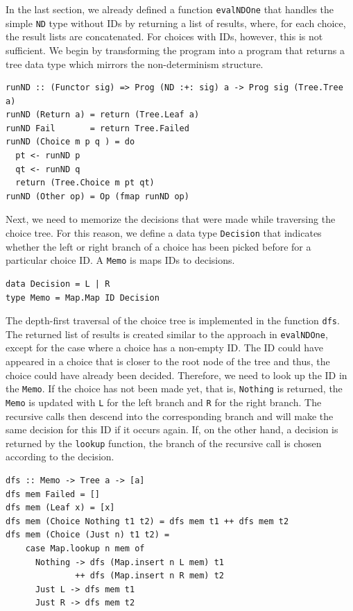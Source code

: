 \documentclass[a4paper, 11pt, fleqn, twoside]{scrreprt}
\newcommand{\todo}[1]{\marginpar{\textbf{TODO:} #1}}
\newcommand{\hinl}[1]{\texttt{#1}}
\begin{document}
In the last section, we already defined a function \hinl{evalNDOne} that handles the simple \hinl{ND} type without IDs by returning a list of results, where, for each choice, the result lists are concatenated.
For choices with IDs, however, this is not sufficient.
We begin by transforming the program into a program that returns a tree data type which mirrors the non-determinism structure.
\todo{Keep tree structure?}
 
\begin{verbatim}
runND :: (Functor sig) => Prog (ND :+: sig) a -> Prog sig (Tree.Tree a)
runND (Return a) = return (Tree.Leaf a)
runND Fail       = return Tree.Failed
runND (Choice m p q ) = do
  pt <- runND p
  qt <- runND q
  return (Tree.Choice m pt qt)
runND (Other op) = Op (fmap runND op)
\end{verbatim}

Next, we need to memorize the decisions that were made while traversing the choice tree.
For this reason, we define a data type \hinl{Decision} that indicates whether the left or right branch of a choice has been picked before for a particular choice ID.
A \hinl{Memo} is maps IDs to decisions.

\begin{verbatim}
data Decision = L | R
type Memo = Map.Map ID Decision
\end{verbatim}

The depth-first traversal of the choice tree is implemented in the function \hinl{dfs}.
The returned list of results is created similar to the approach in \hinl{evalNDOne}, except for the case where a choice has a non-empty ID.
The ID could have appeared in a choice that is closer to the root node of the tree and thus, the choice could have already been decided.
Therefore, we need to look up the ID in the \hinl{Memo}.
If the choice has not been made yet, that is, \hinl{Nothing} is returned, the \hinl{Memo} is updated with \hinl{L} for the left branch and \hinl{R} for the right branch.
The recursive calls then descend into the corresponding branch and will make the same decision for this ID if it occurs again.
If, on the other hand, a decision is returned by the \hinl{lookup} function, the branch of the recursive call is chosen according to the decision.

\begin{verbatim}
dfs :: Memo -> Tree a -> [a]
dfs mem Failed = []
dfs mem (Leaf x) = [x]
dfs mem (Choice Nothing t1 t2) = dfs mem t1 ++ dfs mem t2
dfs mem (Choice (Just n) t1 t2) =
    case Map.lookup n mem of
      Nothing -> dfs (Map.insert n L mem) t1 
              ++ dfs (Map.insert n R mem) t2
      Just L -> dfs mem t1
      Just R -> dfs mem t2
\end{verbatim}
\end{document}
